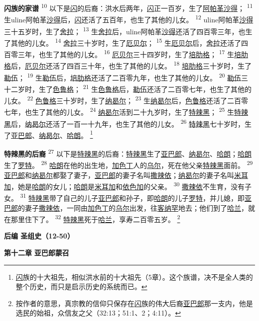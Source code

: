 \textbf{闪族的家谱 }
\textsuperscript{10}
以下是\uline{闪}的后裔：洪水后两年，\uline{闪}正一百岁，生了\uline{阿帕革}\uline{沙得}；
\textsuperscript{11}
生uline{阿帕革}\uline{沙得}后，\uline{闪}还活了五百年，也生了其他的儿女。
\textsuperscript{12}
uline{阿帕革}\uline{沙得}三十五岁时，生了\uline{舍拉}；
\textsuperscript{13}
生\uline{舍拉}后，uline{阿帕革}\uline{沙得}还活了四百零三年，也生了其他的儿女。
\textsuperscript{14}
\uline{舍拉}三十岁时，生了\uline{厄贝尔}；
\textsuperscript{15}
生\uline{厄贝尔}后，\uline{舍拉}还活了四百零三年，也生了其他的儿女。
\textsuperscript{16}
\uline{厄贝尔}三十四岁时，生了\uline{培肋格}；
\textsuperscript{17}
生\uline{培肋格}后，\uline{厄贝尔}还活了四百三十年，也生了其他的儿女。
\textsuperscript{18}
\uline{培肋格}三十岁时，生了\uline{勒伍}；
\textsuperscript{19}
生\uline{勒伍}后，\uline{培肋格}还活了二百零九年，也生了其他的儿女。
\textsuperscript{20}
\uline{勒伍}三十二岁时，生了\uline{色鲁格}；
\textsuperscript{21}
生\uline{色鲁格}后，\uline{勒伍}还活了二百零七年，也生了其他的儿女。
\textsuperscript{22}
\uline{色鲁格}三十岁时，生了\uline{纳曷尔}；
\textsuperscript{23}
生\uline{纳曷尔}后，\uline{色鲁格}还活了二百零七年，也生了其他的儿女。
\textsuperscript{24}
\uline{纳曷尔}活到二十九岁时，生了\uline{特辣黑}；
\textsuperscript{25}
生\uline{特辣黑}后，\uline{纳曷尔}还活了一百一十九年，也生了其他的儿女。
\textsuperscript{26}
\uline{特辣黑}七十岁时，生了\uline{亚巴郎}、\uline{纳曷尔}、\uline{哈朗}。
\footnote{\uline{闪}族的十大祖先，相似洪水前的十大祖先（5章）。这个族谱，决不是全人类的整个历史，而只是启示历史的系统而已。}

\textbf{特辣黑的后裔 }
\textsuperscript{27}
以下是\uline{特辣黑}的后裔：\uline{特辣黑}生了\uline{亚巴郎}、\uline{纳曷尔}、\uline{哈朗}；\uline{哈朗}生了\uline{罗特}。
\textsuperscript{28}
\uline{哈朗}在他的出生地，\uline{加色丁}人的\uline{乌尔}，死在他父亲\uline{特辣黑}面前。
\textsuperscript{29}
\uline{亚巴郎}和\uline{纳曷尔}都娶了妻子，\uline{亚巴郎}的妻子名叫\uline{撒辣依}；\uline{纳曷尔}的妻子名叫\uline{米耳加}，她是\uline{哈朗}的女儿；\uline{哈朗}是\uline{米耳加}和\uline{依色加}的父亲。
\textsuperscript{30}
\uline{撒辣依}不生育，没有子女。
\textsuperscript{31}
\uline{特辣黑}带了自己的儿子\uline{亚巴郎}和孙子，即\uline{哈朗}的儿子\uline{罗特}，并儿媳，即\uline{亚巴郎}的妻子\uline{撒辣依}，一同由\uline{加色丁}的\uline{乌尔}出发，往\uline{客纳罕}地去；他们到了\uline{哈兰}，就在那里住下了。
\textsuperscript{32}
\uline{特辣黑}死于\uline{哈兰}，享寿二百零五岁。
\footnote{按作者的意思，真宗教的信仰只保存在\uline{闪}族的伟大后裔\uline{亚巴郎}那一支内，他是选民的始祖，众信友之父（32:13；51:1、2；4:11）。}

\begin{center}
	\textbf{后编 圣组史（12-50）}
\end{center}

\textbf{第十二章 }
\textbf{亚巴郎蒙召 }